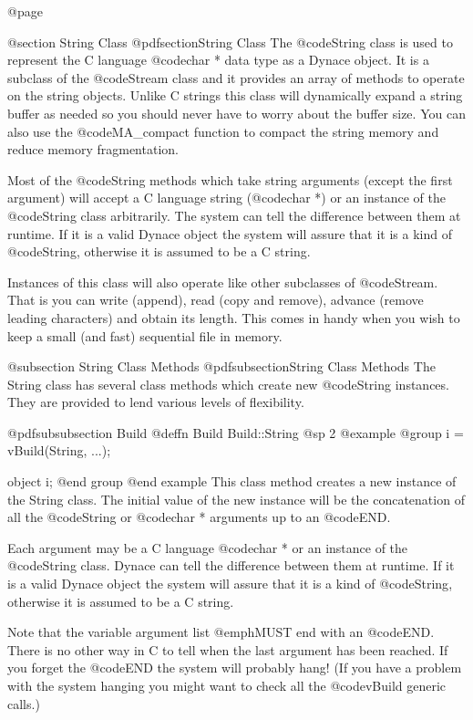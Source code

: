 @page

@section String Class
@pdfsection{String Class}
The @code{String} class is used to represent the C language
@code{char *} data type as a Dynace object.  It is a subclass
of the @code{Stream} class and it provides an array of methods
to operate on the string objects.  Unlike C strings this class will
dynamically expand a string buffer as needed so you should never have to
worry about the buffer size.  You can also use the @code{MA_compact}
function to compact the string memory and reduce memory fragmentation.

Most of the @code{String} methods which take string arguments (except
the first argument) will accept a C language string (@code{char *}) or
an instance of the @code{String} class arbitrarily.  The system can tell
the difference between them at runtime.  If it is a valid Dynace object 
the system will assure that it is a kind of @code{String}, otherwise
it is assumed to be a C string.

Instances of this class will also operate like other subclasses of
@code{Stream}.  That is you can write (append), read (copy and remove),
advance (remove leading characters) and obtain its length.  This
comes in handy when you wish to keep a small (and fast) sequential
file in memory.


@subsection String Class Methods
@pdfsubsection{String Class Methods}
The String class has several class methods which create new @code{String}
instances.  They are provided to lend various levels of flexibility.







@pdfsubsubsection {Build}
@deffn {Build} Build::String
@sp 2
@example
@group
i = vBuild(String, ...);

object  i;
@end group
@end example
This class method creates a new instance of the String class.
The initial value of the new instance will be the concatenation
of all the @code{String} or @code{char *} arguments up to an @code{END}.

Each argument may be a C language @code{char *} or an instance of the
@code{String} class.  Dynace can tell the difference between them at
runtime.  If it is a valid Dynace object the system will assure that it is
a kind of @code{String}, otherwise it is assumed to be a C string.

Note that the variable argument list @emph{MUST} end with an @code{END}.
There is no other way in C to tell when the last argument has been reached.
If you forget the @code{END} the system will probably hang!  (If you
have a problem with the system hanging you might want to check all the
@code{vBuild} generic calls.)

